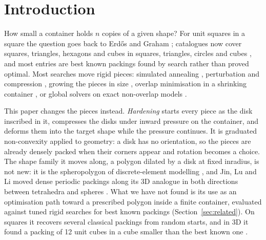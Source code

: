 \section{Introduction}
How small a container holds $n$ copies of a given shape? For unit squares in a square the question goes back to Erd\H{o}s and Graham \cite{erdosgraham}; catalogues now cover squares, triangles, hexagons and cubes in squares, triangles, circles and cubes \cite{friedmancenter,squaresproject}, and most entries are best known packings found by search rather than proved optimal. Most searches move rigid pieces: simulated annealing \cite{kirkpatrick}, perturbation and compression \cite{Gensane2004,gensane}, growing the pieces in size \cite{lubachevsky}, overlap minimisation in a shrinking container \cite{Umetani2009,Gardeyn2025}, or global solvers on exact non-overlap models \cite{Berthold2026}.

This paper changes the pieces instead. \emph{Hardening} starts every piece as the disk inscribed in it, compresses the disks under inward pressure on the container, and deforms them into the target shape while the pressure continues. It is graduated non-convexity \cite{blake} applied to geometry: a disk has no orientation, so the pieces are already densely packed when their corners appear and rotation becomes a choice. The shape family it moves along, a polygon dilated by a disk at fixed inradius, is not new: it is the spheropolygon of discrete-element modelling \cite{AlonsoMarroquin2008}, and Jin, Lu and Li moved dense periodic packings along its 3D analogue in both directions between tetrahedra and spheres \cite{Jin2015}. What we have not found is its use as an optimisation path toward a prescribed polygon inside a finite container, evaluated against tuned rigid searches for best known packings (Section~\ref{sec:related}). On squares it recovers several classical packings from random starts, and in 3D it found a packing of 12 unit cubes in a cube smaller than the best known one \cite{nakajima12}.

